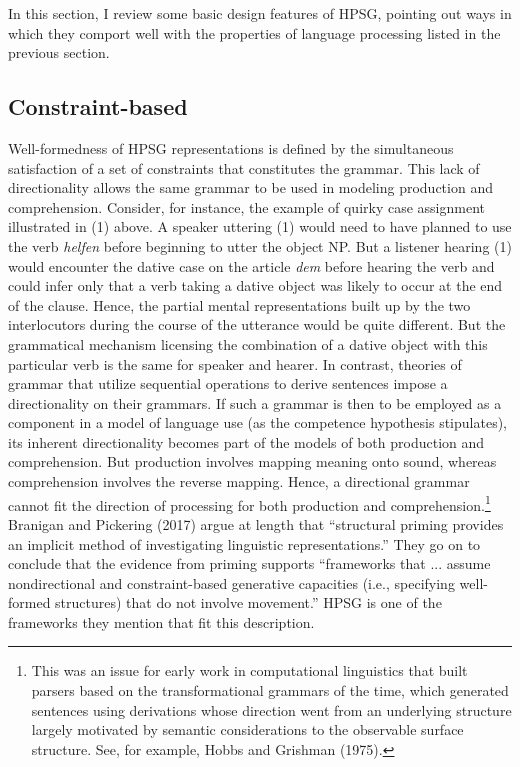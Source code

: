\documentclass[a4paper]{article}
\begin{document}
In this section, I review some basic design features of HPSG, pointing out ways in which they comport well with the properties of language processing listed in the previous section.

\subsection{Constraint-based}

Well-formedness of HPSG representations is defined by the simultaneous satisfaction of a set of constraints that constitutes the grammar.  This lack of directionality allows the same grammar to be used in modeling production and comprehension.
\newline
\newline
Consider, for instance, the example of quirky case assignment illustrated in (1) above.  A speaker uttering (1) would need to have planned to use the verb {\it helfen} before beginning to utter the object NP.  But a listener hearing (1) would encounter the dative case on the article {\it dem} before hearing the verb and could infer only that a verb taking a dative object was likely to occur at the end of the clause.  Hence, the partial mental representations built up by the two interlocutors during the course of the utterance would be quite different.  But the grammatical mechanism licensing the combination of a dative object with this particular verb is the same for speaker and hearer. 
\newline
\newline
In contrast, theories of grammar that utilize sequential operations to derive sentences impose a directionality on their grammars.  If such a grammar is then to be employed as a component in a model of language use (as the competence hypothesis stipulates), its inherent directionality becomes part of the models of both production and comprehension.  But production involves mapping meaning onto sound, whereas comprehension involves the reverse mapping.  Hence, a directional grammar cannot fit the direction of processing for both production and comprehension.\footnote{This was an issue for early work in computational linguistics that built parsers based on the transformational grammars of the time, which generated sentences using derivations whose direction went from an underlying structure largely motivated by semantic considerations to the observable surface structure.  See, for example, Hobbs and Grishman (1975).}  
\newline
\newline
Branigan and Pickering (2017) argue at length that ``structural priming provides an implicit method of investigating linguistic representations.''  They go on to conclude that the evidence from priming supports ``frameworks that ... assume nondirectional and constraint-based generative
capacities (i.e., specifying well-formed structures) that
do not involve movement.''  HPSG is one of the frameworks they mention that fit this description.
\end{document}
